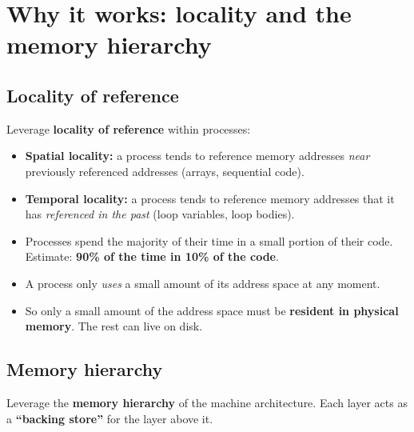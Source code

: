 \documentclass[11pt,a4paper]{article}
\begin{document}
\section{Why it works: locality and the memory hierarchy}

\subsection{Locality of reference}

Leverage \textbf{locality of reference} within processes:
\begin{itemize}
  \item \textbf{Spatial locality:} a process tends to reference memory
        addresses \emph{near} previously referenced addresses
        (arrays, sequential code).
  \item \textbf{Temporal locality:} a process tends to reference memory
        addresses that it has \emph{referenced in the past}
        (loop variables, loop bodies).
  \item Processes spend the majority of their time in a small portion of
        their code. Estimate: \textbf{90\% of the time in 10\% of the code}.
\end{itemize}

\begin{keybox}[Implication]
\begin{itemize}
  \item A process only \emph{uses} a small amount of its address space at
        any moment.
  \item So only a small amount of the address space must be
        \textbf{resident in physical memory}. The rest can live on disk.
\end{itemize}
\end{keybox}

\subsection{Memory hierarchy}

Leverage the \textbf{memory hierarchy} of the machine architecture.
Each layer acts as a \textbf{``backing store''} for the layer above it.
\end{document}
